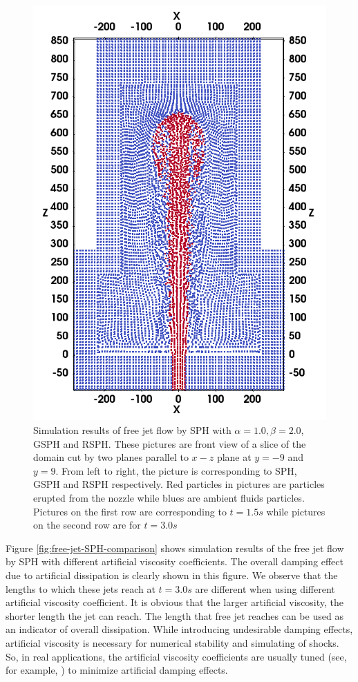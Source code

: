 \documentclass[review]{elsarticle}
\begin{document}
\begin{figure}[!ht]
\begin{minipage}[t]{.325\textwidth}
        \includegraphics[width=0.99 \textwidth]{./Figures/RSPH-t3-cutView}
    \end{minipage}%
    \caption{Simulation results of free jet flow by SPH with $\alpha=1.0, \beta=2.0$, GSPH and RSPH. These pictures are front view of a slice of the domain cut by two planes parallel to $x-z$ plane at $y=-9$ and $y=9$. From left to right, the picture is corresponding to SPH, GSPH and RSPH respectively. Red particles in pictures are particles erupted from the nozzle while blues are ambient fluids particles. Pictures on the first row are corresponding to $t=1.5s$ while pictures on the second row are for $t=3.0 s$}
    \label{fig:free-jet-comparison}
\end{figure}

Figure \ref{fig:free-jet-SPH-comparison} shows simulation results of the free jet flow by SPH with different artificial viscosity coefficients. The overall damping effect due to artificial dissipation is clearly shown in this figure. We observe that the lengths to which these jets reach at $t=3.0 s$ are different when using different artificial viscosity coefficient. It is obvious that the larger artificial viscosity, the shorter length the jet can reach. The length that free jet reaches can be used as an indicator of overall dissipation. While introducing undesirable damping effects, artificial viscosity is necessary for numerical stability and simulating of shocks. So, in real applications, the artificial viscosity coefficients are usually tuned (see, for example, \citep{gmd-2017-119}) to minimize artificial damping effects.
\end{document}
